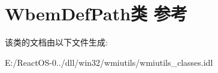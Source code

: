 \hypertarget{class_wbem_def_path}{}\section{Wbem\+Def\+Path类 参考}
\label{class_wbem_def_path}


该类的文档由以下文件生成\+:\begin{DoxyCompactItemize}
\item 
E\+:/\+React\+O\+S-\/0../dll/win32/wmiutils/wmiutils\+\_\+classes.\+idl\end{DoxyCompactItemize}
